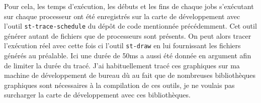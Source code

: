 Pour cela, les temps d'exécution, les débuts et les fins de chaque jobs s'exécutant sur chaque processeur ont été enregistrés sur la carte de développement avec l'outil \texttt{st-trace-schedule} du dépôt de code mentionnée précédemment. Cet outil générer autant de fichiers que de processeurs sont présents. On peut alors tracer l'exécution réel avec cette fois ci l'outil \texttt{st-draw} en lui fournissant les fichiers générés au préalable. Ici une durée de 50ms a aussi été donnée en argument afin de limiter la durée du tracé. J'ai habituellement tracé ces graphiques sur ma machine de développement de bureau dù au fait que de nombreuses bibliothèques graphiques sont nécessaires à la compilation de ces outils, je ne voulais pas surcharger la carte de développement avec ces bibliothèques.
